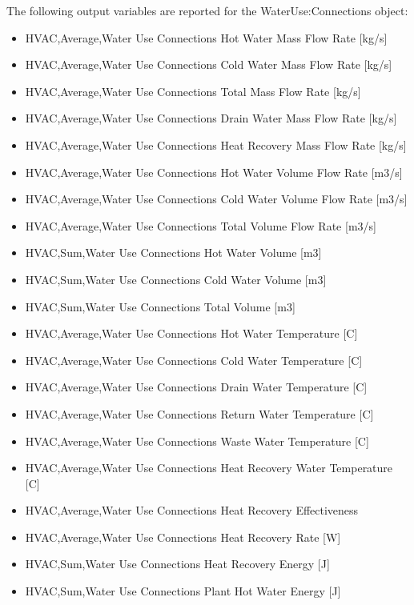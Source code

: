 The following output variables are reported for the WaterUse:Connections object:

\begin{itemize}
\item
  HVAC,Average,Water Use Connections Hot Water Mass Flow Rate {[}kg/s{]}
\item
  HVAC,Average,Water Use Connections Cold Water Mass Flow Rate {[}kg/s{]}
\item
  HVAC,Average,Water Use Connections Total Mass Flow Rate {[}kg/s{]}
\item
  HVAC,Average,Water Use Connections Drain Water Mass Flow Rate {[}kg/s{]}
\item
  HVAC,Average,Water Use Connections Heat Recovery Mass Flow Rate {[}kg/s{]}
\item
  HVAC,Average,Water Use Connections Hot Water Volume Flow Rate {[}m3/s{]}
\item
  HVAC,Average,Water Use Connections Cold Water Volume Flow Rate {[}m3/s{]}
\item
  HVAC,Average,Water Use Connections Total Volume Flow Rate {[}m3/s{]}
\item
  HVAC,Sum,Water Use Connections Hot Water Volume {[}m3{]}
\item
  HVAC,Sum,Water Use Connections Cold Water Volume {[}m3{]}
\item
  HVAC,Sum,Water Use Connections Total Volume {[}m3{]}
\item
  HVAC,Average,Water Use Connections Hot Water Temperature {[}C{]}
\item
  HVAC,Average,Water Use Connections Cold Water Temperature {[}C{]}
\item
  HVAC,Average,Water Use Connections Drain Water Temperature {[}C{]}
\item
  HVAC,Average,Water Use Connections Return Water Temperature {[}C{]}
\item
  HVAC,Average,Water Use Connections Waste Water Temperature {[}C{]}
\item
  HVAC,Average,Water Use Connections Heat Recovery Water Temperature {[}C{]}
\item
  HVAC,Average,Water Use Connections Heat Recovery Effectiveness \protect\hyperlink{section-1}{}
\item
  HVAC,Average,Water Use Connections Heat Recovery Rate {[}W{]}
\item
  HVAC,Sum,Water Use Connections Heat Recovery Energy {[}J{]}
\item
  HVAC,Sum,Water Use Connections Plant Hot Water Energy {[}J{]}
\end{itemize}

